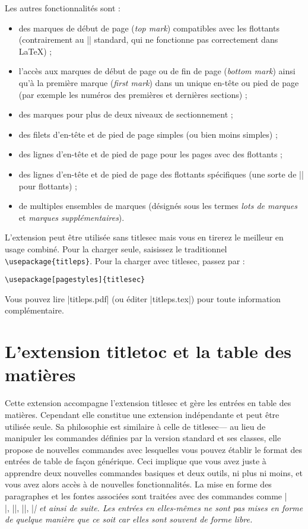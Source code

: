 \documentclass[a4paper]{ltxguide}
\begin{document}
Les autres fonctionnalités sont :
\begin{itemize}
\item des marques de début de page (\emph{top mark}) compatibles avec les flottants 
(contrairement au |\topmark| standard, qui ne fonctionne pas correctement dans \LaTeX{}) ;
\item l'accès aux marques de début de page ou de fin de page (\emph{bottom mark}) ainsi 
qu'à la première marque (\emph{first mark}) dans un unique en-tête ou pied de page (par 
exemple les numéros des premières et dernières sections) ;
\item des marques pour plus de deux niveaux de sectionnement ;
\item des filets d'en-tête et de pied de page simples (ou bien moins simples) ;
\item des lignes d'en-tête et de pied de page pour les pages avec des flottants ;
\item des lignes d'en-tête et de pied de page des flottants spécifiques (une sorte 
de |\thispagestyle| pour flottants) ;
\item de multiples ensembles de marques (désignés sous les termes \emph{lots de marques
} et \textit{marques supplémentaires}).
\end{itemize}

L'extension peut être utilisée sans \textsf{titlesec} mais vous en tirerez le meilleur
en usage combiné. Pour la charger seule, saisissez le traditionnel 
\verb|\usepackage{titleps}|. Pour la charger avec \textsf{titlesec}, passez par :
\begin{verbatim}
\usepackage[pagestyles]{titlesec}
\end{verbatim}

Vous pouvez lire |titleps.pdf| (ou éditer |titleps.tex|) pour toute information
complémentaire.

\section{L'extension \textsf{titletoc} et la table des matières}

Cette extension accompagne l'extension \textsf{titlesec} et gère les entrées en
table des matières. Cependant elle constitue une extension indépendante et peut
être utilisée seule. Sa philosophie est similaire à celle de \textsf{titlesec}---
au lieu de manipuler les commandes définies par la version standard et ses classes,
elle propose de nouvelles commandes avec lesquelles vous pouvez établir le format
des entrées de table de façon générique. Ceci implique que vous avez juste à 
apprendre deux nouvelles commandes basiques et deux outils, ni plus ni moins, et
vous avez alors accès à de nouvelles fonctionnalités. La mise en forme des
paragraphes et les fontes associées sont traitées avec des commandes comme
|\\|, |\makebox|, |\large|, |\itshape| et ainsi de suite. Les entrées en elles-mêmes
ne sont pas mises en forme de quelque manière que ce soit car elles sont souvent
de forme libre.
\end{document}

